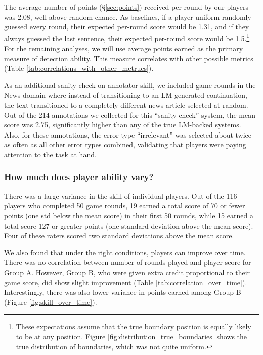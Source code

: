 The average number of points (\S\ref{sec:points}) received per round by our players was 2.08, well above random chance.
As baselines, if a player uniform randomly guessed every round, their expected per-round score would be 1.31, and
if they always guessed the last sentence, their expected per-round score would be 1.5.\footnote{These expectations assume that the true boundary position is equally likely to be at any position. Figure \ref{fig:distribution_true_boundaries} shows the true distribution of boundaries, which was not quite uniform.}
For the remaining analyses, we will use average points earned as the primary measure of detection ability.
This measure correlates with other possible metrics (Table \ref{tab:correlations_with_other_metrucs}).

As an additional sanity check on annotator skill, we included game rounds in the News domain where instead of transitioning to an LM-generated continuation, the text transitioned to a completely different news article selected at random.
Out of the 214 annotations we collected for this ``sanity check'' system, the mean score was 2.75, significantly higher than any of the true LM-backed systems.
Also, for these annotations, the error type ``irrelevant'' was selected about twice as often as all other error types combined, validating that players were paying attention to the task at hand.

\subsubsection{How much does player ability vary?}
There was a large variance in the skill of individual players.
Out of the 116 players who completed 50 game rounds, 19 earned a total score of 70 or fewer points (one std below the mean score) in their first 50 rounds, while 15 earned a total score 127 or greater points (one standard deviation above the mean score). Four of these raters scored two standard deviations above the mean score.

We also found that under the right conditions, players can improve over time.
There was no correlation between number of rounds played and player score for Group A.
However, Group B, who were given extra credit proportional to their game score, did show slight improvement (Table \ref{tab:correlation_over_time}). 
Interestingly, there was also lower variance in points earned among Group B (Figure \ref{fig:skill_over_time}).


